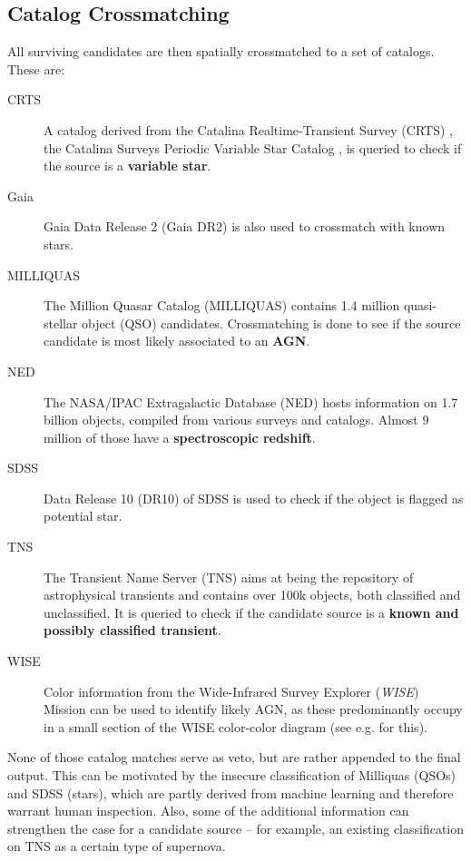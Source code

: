 \subsection{Catalog Crossmatching} \label{catmatch}
All surviving candidates are then spatially crossmatched to a set of catalogs. These are:
\begin{description}
    \item[CRTS] A catalog derived from the Catalina Realtime-Transient Survey (CRTS) , the Catalina Surveys Periodic Variable Star Catalog , is queried to check if the source is a \textbf{variable star}.
    \item[Gaia] Gaia Data Release 2 (Gaia DR2)  is also used to crossmatch with known stars.
    \item[MILLIQUAS] The Million Quasar Catalog (MILLIQUAS)  contains 1.4 million quasi-stellar object (QSO) candidates. Crossmatching is done to see if the source candidate is most likely associated to an \textbf{AGN}.
    \item[NED] The NASA/IPAC Extragalactic Database (NED) hosts information on 1.7 billion objects, compiled from various surveys and catalogs. Almost 9 million of those have a \textbf{spectroscopic redshift}.
    \item[SDSS] Data Release 10 (DR10)  of SDSS is used to check if the object is flagged as potential star.
    \item[TNS] The Transient Name Server (TNS) aims at being the repository of astrophysical transients and contains over 100k objects, both classified and unclassified. It is queried to check if the candidate source is a \textbf{known and possibly classified transient}.
    \item[WISE] Color information from the Wide-Infrared Survey Explorer (\textit{WISE}) Mission  can be used to identify likely AGN, as these predominantly occupy in a small section of the WISE color-color diagram (see e.g.  for this).
\end{description}
None of those catalog matches serve as veto, but are rather appended to the final output. This can be motivated by the insecure classification of Milliquas (QSOs) and SDSS (stars), which are partly derived from machine learning and therefore warrant human inspection. Also, some of the additional information can strengthen the case for a candidate source -- for example, an existing classification on TNS as a certain type of supernova. 

